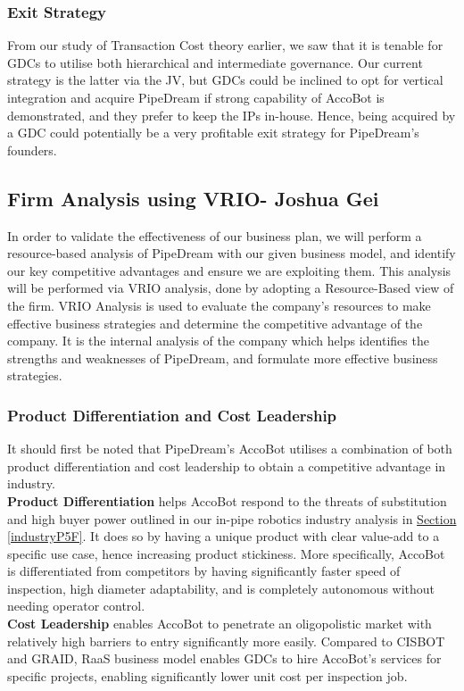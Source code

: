 \documentclass[11pt]{article}		%
\newcommand{\sectref}[1]{\hyperref[#1]{Section \ref*{#1}}}     %
\begin{document}
    	\subsubsection{Exit Strategy}
    	From our study of Transaction Cost theory earlier, we saw that it is tenable for GDCs to utilise both hierarchical and intermediate governance. Our current strategy is the latter via the JV, but GDCs could be inclined to opt for vertical integration and acquire PipeDream if strong capability of AccoBot is demonstrated, and they prefer to keep the IPs in-house. Hence, being acquired by a GDC could potentially be a very profitable exit strategy for PipeDream’s founders. 
            
	\subsection[Firm Analysis using VRIO]{Firm Analysis using VRIO- Joshua Gei} \label{vrioAnalysisSection}
	In order to validate the effectiveness of our business plan, we will perform a resource-based analysis of PipeDream with our given business model, and identify our key competitive advantages and ensure we are exploiting them. This analysis will be performed via VRIO analysis, done by adopting a Resource-Based view of the firm. VRIO Analysis is used to evaluate the company’s resources to make effective business strategies and determine the competitive advantage of the company. It is the internal analysis of the company which
    helps identifies the strengths and weaknesses of PipeDream, and formulate more effective business strategies. 
	
	\subsubsection{Product Differentiation and Cost Leadership}\label{strategy}
	It should first be noted that PipeDream's AccoBot utilises a combination of both product differentiation and cost leadership to obtain a competitive advantage in industry.
	\\ 
	\hspace*{3ex} \textbf{Product Differentiation} helps AccoBot respond to the threats of substitution and high buyer power outlined in our in-pipe robotics industry analysis in \sectref{industryP5F}. It does so by having a unique product with clear value-add to a specific use case, hence increasing product stickiness. More specifically, AccoBot is differentiated from competitors by having significantly faster speed of inspection, high diameter adaptability, and is completely autonomous without needing operator control.
	\\ \hspace*{3ex} \textbf{Cost Leadership} enables AccoBot to penetrate an oligopolistic market with relatively high barriers to entry significantly more easily. Compared to CISBOT and GRAID, RaaS business model enables GDCs to hire AccoBot's services for specific projects, enabling significantly lower unit cost per inspection job. 
	
\end{document}
